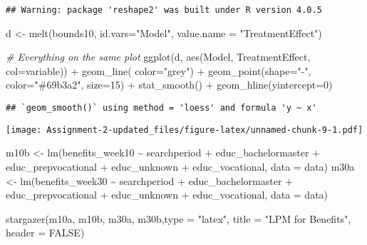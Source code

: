 \documentclass[
]{article}
\newenvironment{Shaded}{\begin{snugshade}}{\end{snugshade}}
\newcommand{\AttributeTok}[1]{\textcolor[rgb]{0.77,0.63,0.00}{#1}}
\newcommand{\CommentTok}[1]{\textcolor[rgb]{0.56,0.35,0.01}{\textit{#1}}}
\newcommand{\ConstantTok}[1]{\textcolor[rgb]{0.00,0.00,0.00}{#1}}
\newcommand{\DecValTok}[1]{\textcolor[rgb]{0.00,0.00,0.81}{#1}}
\newcommand{\FunctionTok}[1]{\textcolor[rgb]{0.00,0.00,0.00}{#1}}
\newcommand{\NormalTok}[1]{#1}
\newcommand{\OtherTok}[1]{\textcolor[rgb]{0.56,0.35,0.01}{#1}}
\newcommand{\SpecialCharTok}[1]{\textcolor[rgb]{0.00,0.00,0.00}{#1}}
\newcommand{\StringTok}[1]{\textcolor[rgb]{0.31,0.60,0.02}{#1}}
\begin{document}
\begin{verbatim}
## Warning: package 'reshape2' was built under R version 4.0.5
\end{verbatim}

\begin{Shaded}
\begin{Highlighting}[]
\NormalTok{d }\OtherTok{\textless{}{-}} \FunctionTok{melt}\NormalTok{(bounds10, }\AttributeTok{id.vars=}\StringTok{"Model"}\NormalTok{, }\AttributeTok{value.name =} \StringTok{"TreatmentEffect"}\NormalTok{)}

\CommentTok{\# Everything on the same plot}
\FunctionTok{ggplot}\NormalTok{(d, }\FunctionTok{aes}\NormalTok{(Model, TreatmentEffect, }\AttributeTok{col=}\NormalTok{variable)) }\SpecialCharTok{+} 
  \FunctionTok{geom\_line}\NormalTok{( }\AttributeTok{color=}\StringTok{"grey"}\NormalTok{) }\SpecialCharTok{+}
  \FunctionTok{geom\_point}\NormalTok{(}\AttributeTok{shape=}\StringTok{"{-}"}\NormalTok{, }\AttributeTok{color=}\StringTok{"\#69b3a2"}\NormalTok{, }\AttributeTok{size=}\DecValTok{15}\NormalTok{) }\SpecialCharTok{+}
  \FunctionTok{stat\_smooth}\NormalTok{() }\SpecialCharTok{+}
  \FunctionTok{geom\_hline}\NormalTok{(}\AttributeTok{yintercept=}\DecValTok{0}\NormalTok{)}
\end{Highlighting}
\end{Shaded}

\begin{verbatim}
## `geom_smooth()` using method = 'loess' and formula 'y ~ x'
\end{verbatim}

\texttt{[image: Assignment-2-updated\_files/figure-latex/unnamed-chunk-9-1.pdf]}

\begin{Shaded}
\begin{Highlighting}[]
\NormalTok{m10b }\OtherTok{\textless{}{-}} \FunctionTok{lm}\NormalTok{(benefits\_week10 }\SpecialCharTok{\textasciitilde{}}\NormalTok{ searchperiod }\SpecialCharTok{+}\NormalTok{ educ\_bachelormaster }\SpecialCharTok{+}\NormalTok{ educ\_prepvocational }\SpecialCharTok{+}\NormalTok{ educ\_unknown }\SpecialCharTok{+}\NormalTok{ educ\_vocational, }\AttributeTok{data =}\NormalTok{ data)}
\NormalTok{m30a }\OtherTok{\textless{}{-}} \FunctionTok{lm}\NormalTok{(benefits\_week30 }\SpecialCharTok{\textasciitilde{}}\NormalTok{ searchperiod }\SpecialCharTok{+}\NormalTok{ educ\_bachelormaster }\SpecialCharTok{+}\NormalTok{ educ\_prepvocational }\SpecialCharTok{+}\NormalTok{ educ\_unknown }\SpecialCharTok{+}\NormalTok{ educ\_vocational, }\AttributeTok{data =}\NormalTok{ data)}

\FunctionTok{stargazer}\NormalTok{(m10a, m10b, m30a, m30b,}\AttributeTok{type =} \StringTok{"latex"}\NormalTok{,}
         \AttributeTok{title =} \StringTok{"LPM for Benefits"}\NormalTok{, }\AttributeTok{header =} \ConstantTok{FALSE}\NormalTok{)}
\end{Highlighting}
\end{Shaded}
\end{document}
